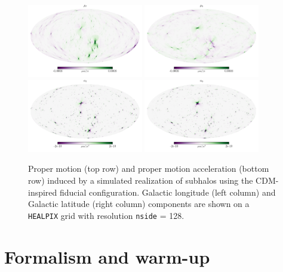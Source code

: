 \documentclass[twocolumn]{aastex63}
\begin{document}
\begin{figure}[tbp]
  \centering
  \includegraphics[width=0.45\textwidth]{plots/mu_l}
  \includegraphics[width=0.45\textwidth]{plots/mu_b}
  \includegraphics[width=0.45\textwidth]{plots/alpha_l}
  \includegraphics[width=0.45\textwidth]{plots/alpha_b}
  \caption{Proper motion (top row) and proper motion acceleration (bottom row) induced by a simulated realization of subhalos using the CDM-inspired fiducial configuration. Galactic longitude (left column) and Galactic latitude (right column) components are shown on a \texttt{HEALPIX} grid with resolution \texttt{nside} = 128.}
  \label{fig:population_maps}
\end{figure}


\section{Formalism and warm-up}
\label{sec:singlesh}
\end{document}

